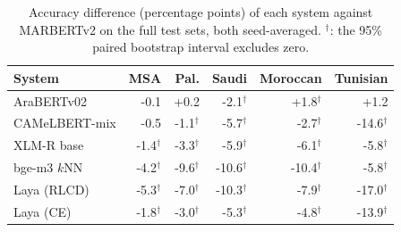 \begin{table}[t]\centering\small\caption{Accuracy difference (percentage points) of each system against MARBERTv2 on the full test sets, both seed-averaged. $^{\dagger}$: the 95\% paired bootstrap interval excludes zero.}\label{tab:sig}
\begin{tabular}{lrrrrr}\toprule
System & MSA & Pal. & Saudi & Moroccan & Tunisian \\\midrule
AraBERTv02 & -0.1 & +0.2 & -2.1$^{\dagger}$ & +1.8$^{\dagger}$ & +1.2 \\
CAMeLBERT-mix & -0.5 & -1.1$^{\dagger}$ & -5.7$^{\dagger}$ & -2.7$^{\dagger}$ & -14.6$^{\dagger}$ \\
XLM-R base & -1.4$^{\dagger}$ & -3.3$^{\dagger}$ & -5.9$^{\dagger}$ & -6.1$^{\dagger}$ & -5.8$^{\dagger}$ \\
bge-m3 $k$NN & -4.2$^{\dagger}$ & -9.6$^{\dagger}$ & -10.6$^{\dagger}$ & -10.4$^{\dagger}$ & -5.8$^{\dagger}$ \\
Laya (RLCD) & -5.3$^{\dagger}$ & -7.0$^{\dagger}$ & -10.3$^{\dagger}$ & -7.9$^{\dagger}$ & -17.0$^{\dagger}$ \\
Laya (CE) & -1.8$^{\dagger}$ & -3.0$^{\dagger}$ & -5.3$^{\dagger}$ & -4.8$^{\dagger}$ & -13.9$^{\dagger}$ \\
\bottomrule\end{tabular}\end{table}
